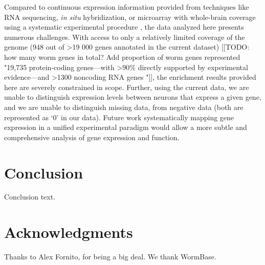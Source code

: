 \documentclass[10pt,letterpaper]{article}
\begin{document}
Compared to continuous expression information provided from techniques like RNA sequencing, \emph{in situ} hybridization, or microarray with whole-brain coverage using a systematic experimental procedure \cite{Lein:2007jn, Shen:2012ua, Tasic:2016jp}, the data analyzed here presents numerous challenges.
With access to only a relatively limited coverage of the genome (948 out of >19 000 genes \cite{Hillier2005} annotated in the current dataset) [[TODO: how many worm genes in total? Add proportion of worm genes represented "19,735 protein-coding genes—with >90\% directly supported by experimental evidence—and >1300 noncoding RNA genes \cite{Hillier2005}"]], the enrichment results provided here are severely constrained in scope.
Further, using the current data, we are unable to distinguish expression levels between neurons that express a given gene, and we are unable to distinguish missing data, from negative data (both are represented as `0' in our data).
Future work systematically mapping gene expression in a unified experimental paradigm would allow a more subtle and comprehensive analysis of gene expression and function.


\section*{Conclusion}

Conclusion text.

\section*{Acknowledgments}
Thanks to Alex Fornito, for being a big deal.
We thank WormBase.

\nolinenumbers

%
%
%



\end{document}
